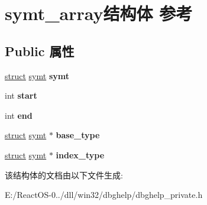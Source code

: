 \hypertarget{structsymt__array}{}\section{symt\+\_\+array结构体 参考}
\label{structsymt__array}
\subsection*{Public 属性}
\begin{DoxyCompactItemize}
\item 
\mbox{\label{structsymt__array_a25f1d1fc308732a8b9a7a675c9a26c46}} 
\hyperlink{interfacestruct}{struct} \hyperlink{structsymt}{symt} {\bfseries symt}
\item 
\mbox{\label{structsymt__array_a804a243542868b1abdbccaef4e3145eb}} 
int {\bfseries start}
\item 
\mbox{\label{structsymt__array_a0cb2b5aff4613cc3ab2ae59d821efbd8}} 
int {\bfseries end}
\item 
\mbox{\label{structsymt__array_a1d9b54688bed89855b101f1136cab925}} 
\hyperlink{interfacestruct}{struct} \hyperlink{structsymt}{symt} $\ast$ {\bfseries base\+\_\+type}
\item 
\mbox{\label{structsymt__array_a9ae3da58a3dbcafe83f6f7eef2941a6b}} 
\hyperlink{interfacestruct}{struct} \hyperlink{structsymt}{symt} $\ast$ {\bfseries index\+\_\+type}
\end{DoxyCompactItemize}


该结构体的文档由以下文件生成\+:\begin{DoxyCompactItemize}
\item 
E\+:/\+React\+O\+S-\/0../dll/win32/dbghelp/dbghelp\+\_\+private.\+h\end{DoxyCompactItemize}
